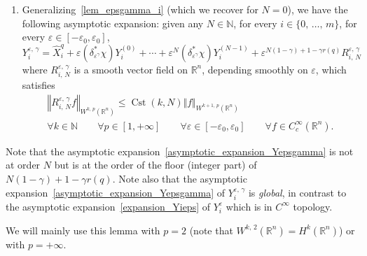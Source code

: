 \documentclass[AHL,Unicode,published]{cedram}
\newcommand*\R{\mathbb{R}}
\newcommand*\N{\mathbb{N}}
\DeclareMathOperator{\Cst}{Cst}
\DeclareMathOperator{\Lie}{Lie}
\renewcommand{\leq}{\leqslant}
\let\oldforall\forall
\renewcommand*{\forall}{\mathrel{\oldforall}}
\begin{document}
\begin{lemm}
\begin{enumerate}
In particular, if $\varepsilon_0$ is small enough then $\Lie(Y_1^{\varepsilon,\,\gamma},\,\ldots,\,Y_m^{\varepsilon,\,\gamma})=\R^n$ for every $\varepsilon\in[-\varepsilon_0,\varepsilon_0]$, with a uniform degree of nonholonomy $r$.

\item\label{lem_epsgamma_iv}
Generalizing~\eqref{lem_epsgamma_i} (which we recover for $N=0$), we have the following asymptotic expansion: given any $N\in\N$, for every $i\in\{0,\,\ldots,\,m\}$, for every $\varepsilon\in[-\varepsilon_0,\varepsilon_0]$,
\begin{equation}\label{asymptotic_expansion_Yepsgamma}
Y_i^{\varepsilon,\,\gamma} = \widehat{X}_i^q + \varepsilon \left(\delta_{\varepsilon^\gamma}^*\chi\right) Y_i^{(0)} + \cdots + \varepsilon^N \left(\delta_{\varepsilon^\gamma}^*\chi\right) Y_i^{(N-1)} + \varepsilon^{N(1-\gamma)+1-\gamma r(q)} R_{i,\,N}^{\varepsilon,\,\gamma}
\end{equation}
where $R_{i,\,N}^{\varepsilon,\,\gamma}$ is a smooth vector field on $\R^n$, depending smoothly on $\varepsilon$, which satisfies
\begin{multline*}
\left\Vert R_{i,\,N}^{\varepsilon,\,\gamma} f \right\Vert_{W^{k,\,p}(\R^n)} \leq \Cst(k,N) \Vert f\Vert_{W^{k+1,\,p}(\R^n)} \\
\forall k\in\N\qquad\forall p\in[1,+\infty]\qquad \forall \varepsilon\in[-\varepsilon_0,\varepsilon_0]\qquad \forall f\in C_c^\infty(\R^n).
\end{multline*}
\end{enumerate}
\end{lemm}


Note that the asymptotic expansion~\eqref{asymptotic_expansion_Yepsgamma} is not at order $N$ but is at the order of the floor (integer part) of $N(1-\gamma)+1-\gamma r(q)$. Note also that the asymptotic expansion~\eqref{asymptotic_expansion_Yepsgamma} of $Y_i^{\varepsilon,\,\gamma}$ is \emph{global}, in contrast to the asymptotic expansion~\eqref{expansion_Yieps} of $Y_i^\varepsilon$ which is in $C^\infty$ topology.

We will mainly use this lemma with $p=2$ (note that $W^{k,\,2}(\R^n)=H^k(\R^n)$) or with $p=+\infty$.
\end{document}

